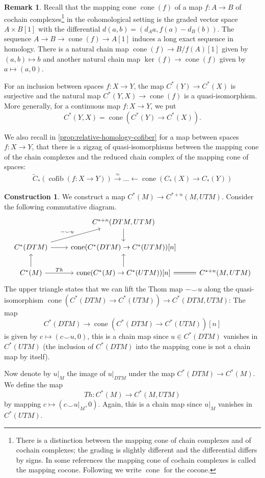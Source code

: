 \documentclass{scrartcl}
\theoremstyle{plain}
\theoremstyle{definition}
\newtheorem{remark}[theorem]{Remark}
\newtheorem{construction}[theorem]{Construction}
\newcommand{\cupp}{\mathbin{\smile}}
\DeclareMathOperator{\cone}{cone}
\DeclareMathOperator{\cofib}{cofib}
\newcommand{\quiso}{\simeq}
\newcommand{\from}{\leftarrow}
\let\xto\xrightarrow
\newcommand{\blank}{-}
\begin{document}
\begin{remark}\label{rmk:cofib-relative-homology}
    Recall that the mapping cone $\cone(f)$ of a map $f\colon A\to B$ of cochain complexes\footnote{There is a distinction between the mapping cone of chain complexes and of cochain complexes; the grading is slightly different and the differential differs by signs. In some references the mapping cone of cochain complexes is called the mapping cocone. Following \cite{naef2019string} we write $\cone$ for the cocone. } in the cohomological setting is the graded vector space $A\times B[1]$ with the differential $d(a, b) = (d_A a, f(a) - d_B(b))$. The sequence $A\to B\to \cone(f)\to A[1]$ induces a long exact sequence in homology. There is a natural chain map  $\cone(f) \to B/f(A)[1]$ given by $(a,b)\mapsto b$ and another natural chain map $\ker(f)\to \cone(f)$ given by $a\mapsto (a, 0)$. 

    For an inclusion between spaces $f\colon X\to Y$, the map $C^*(Y)\to C^*(X)$ is surjective and the natural map $C^*(Y, X)\to \cone(f)$ is a quasi-isomorphism. More generally, for a continuous map $f\colon X\to Y$, we put $$C^*(Y, X) = \cone(C^*(Y)\to C^*(X)).$$

    We also recall in \cref{prop:relative-homology-cofiber} for a map between spaces $f\colon X\to Y$, that there is a zigzag of quasi-isomorphisms between the mapping cone of the chain complexes and the reduced chain complex of the mapping cone of spaces:
    \begin{align*}
        \tilde C_*(\cofib(f\colon X\to Y))\xto{\quiso} \dots\from \cone(C_*(X)\to C_*(Y))
    \end{align*}
\end{remark}

\begin{construction}\label{constr:thom-map-cfg-spaces}
We construct a map $C^*(M) \to C^{*+n}(M, UTM)$. Consider the following commutative diagram.
\[\begin{tikzcd}
     & C^{*+n}(DTM, UTM) \dar & \\
    C^*(DTM)\rar\ar[ur, "\blank\cupp u"]& \cone(C^*(DTM)\to C^*(UTM))[n] & \\
    C^*(M) \uar \rar["Th"] & \cone(C^*(M)\to C^*(UTM))[n] \uar \rar[equal] & C^{*+n}(M, UTM) 
\end{tikzcd}\]
The upper triangle states that we can lift the Thom map $\blank\cupp u$ along the quasi-isomorphism $\cone(C^*(DTM)\to C^*(UTM))\to C^*(DTM, UTM)$: The map $$C^*(DTM)\to \cone(C^*(DTM)\to C^*(UTM))[n]$$
is given by $c\mapsto (c\cupp u, 0)$, this is a chain map since $u\in C^*(DTM)$ vanishes in $C^*(UTM)$ (the inclusion of $C^*(DTM)$ into the mapping cone is not a chain map by itself). 

Now denote by $u|_M$ the image of $u|_{DTM}$ under the map $C^*(DTM)\to C^*(M)$. We define the map $$Th\colon C^*(M)\to C^*(M, UTM)$$ by mapping $c\mapsto (c\cupp u|_M, 0)$. Again, this is a chain map since $u|_M$ vanishes in $C^*(UTM)$.
\end{construction}
\end{document}
